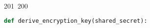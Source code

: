 201~200~\documentclass{article}
\begin{document}
\begin{lstlisting}[language=Python, caption=Key Derivation with HKDF]
	                                                                                                                                                                                                                                                                                                	                                                                                                                                        	    	                                                                                                	                                                                                                                                                                                                                                                                                                                                	                                                                        	                                                def derive_encryption_key(shared_secret):
	                                                                                                                                                                                                                                                                                                	                                                                                                                                        	    	                                                                                                	                                                                                                                                                                                                                                                                                                                                	                                                                        	                                                    """
	                                                                                                                                                                                                                                                                                                	                                                                                                                                        	    	                                                                                                	                                                                                                                                                                                                                                                                                                                                	                                                                        	                                                        \brief Derives an encryption key from a shared secret using HKDF.

\end{lstlisting}
\end{document}
